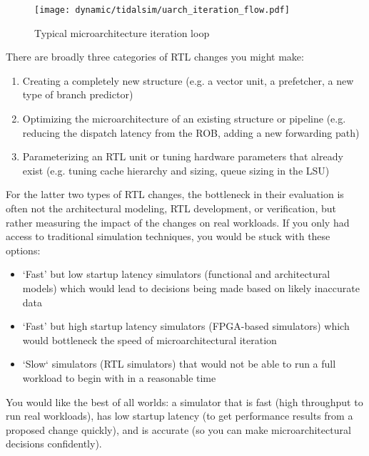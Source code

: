 \documentclass[sigplan,nonacm,10pt]{acmart}
\begin{document}
\begin{figure}
  \texttt{[image: dynamic/tidalsim/uarch\_iteration\_flow.pdf]}
  \caption{Typical microarchitecture iteration loop}
  \label{fig:uarch_iteration_loop}
\end{figure}

There are broadly three categories of RTL changes you might make:
\begin{enumerate}
  \item Creating a completely new structure (e.g. a vector unit, a prefetcher, a new type of branch predictor)
  \item Optimizing the microarchitecture of an existing structure or pipeline (e.g. reducing the dispatch latency from the ROB, adding a new forwarding path)
  \item Parameterizing an RTL unit or tuning hardware parameters that already exist (e.g. tuning cache hierarchy and sizing, queue sizing in the LSU)
\end{enumerate}

For the latter two types of RTL changes, the bottleneck in their evaluation is often not the architectural modeling, RTL development, or verification, but rather measuring the impact of the changes on real workloads.
If you only had access to traditional simulation techniques, you would be stuck with these options:
\begin{itemize}
  \item `Fast' but low startup latency simulators (functional and architectural models) which would lead to decisions being made based on likely inaccurate data
  \item `Fast' but high startup latency simulators (FPGA-based simulators) which would bottleneck the speed of microarchitectural iteration
  \item `Slow` simulators (RTL simulators) that would not be able to run a full workload to begin with in a reasonable time
\end{itemize}

You would like the best of all worlds: a simulator that is fast (high throughput to run real workloads), has low startup latency (to get performance results from a proposed change quickly), and is accurate (so you can make microarchitectural decisions confidently).
\end{document}
